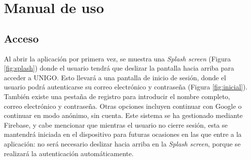 \documentclass[a4paper,12pt]{report}
\begin{document}
\chapter{Manual de uso}
\section{Acceso}
  Al abrir la aplicación por primera vez, se muestra una \textit{Splash screen} (Figura \ref{fig:splash}) donde el usuario tendrá que deslizar la pantalla hacia arriba para acceder a UNIGO. Esto llevará a una pantalla de inicio de sesión, donde el usuario podrá autenticarse su correo electrónico y contraseña (Figura \ref{fig:inicial}). También existe una pestaña de registro para introducir el nombre completo, correo electrónico y contraseña. Otras opciones incluyen continuar con Google o continuar en modo anónimo, sin cuenta. Este sistema se ha gestionado mediante Firebase, y cabe mencionar que mientras el usuario no cierre sesión, esta se mantendrá iniciada en el dispositivo para futuras ocasiones en las que entre a la aplicación: no será necesario deslizar hacia arriba en la \textit{Splash screen}, porque se realizará la autenticación automáticamente.

\vspace{0.3cm}
\end{document}
